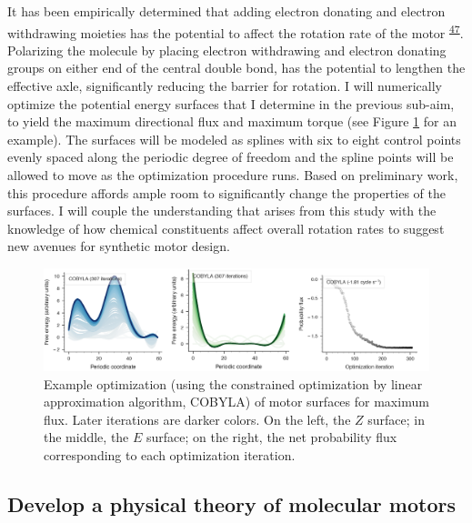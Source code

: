 \documentclass[11pt,notitlepage]{article}
\providecommand{\DIFaddbegin}{} %
\providecommand{\DIFaddend}{} %
\providecommand{\DIFdelbegin}{} %
\providecommand{\DIFdelend}{} %
\newcommand{\DIFscaledelfig}{0.5}
\newlength{\DIFdelgraphicswidth} %
\newlength{\DIFdelgraphicsheight} %
\newcommand{\DIFaddincludegraphics}[2][]{{\color{blue}\fbox{\DIFOincludegraphics[#1]{#2}}}} %
\newcommand{\DIFdelincludegraphics}[2][]{%
\sbox{\DIFdelgraphicsbox}{\DIFOincludegraphics[#1]{#2}}%
\settoboxwidth{\DIFdelgraphicswidth}{\DIFdelgraphicsbox} %
\settoboxtotalheight{\DIFdelgraphicsheight}{\DIFdelgraphicsbox} %
\scalebox{\DIFscaledelfig}{%
\parbox[b]{\DIFdelgraphicswidth}{\usebox{\DIFdelgraphicsbox}\\[-\baselineskip] \rule{\DIFdelgraphicswidth}{0em}}\llap{\resizebox{\DIFdelgraphicswidth}{\DIFdelgraphicsheight}{%
\setlength{\unitlength}{\DIFdelgraphicswidth}%
\begin{picture}(1,1)%
\thicklines\linethickness{2pt} %
{\color[rgb]{1,0,0}\put(0,0){\framebox(1,1){}}}%
{\color[rgb]{1,0,0}\put(0,0){\line( 1,1){1}}}%
{\color[rgb]{1,0,0}\put(0,1){\line(1,-1){1}}}%
\end{picture}%
}\hspace*{3pt}}} %
} %
\DeclareRobustCommand{\DIFaddbegin}{\DIFOaddbegin \let\includegraphics\DIFaddincludegraphics} %
\DeclareRobustCommand{\DIFaddend}{\DIFOaddend \let\includegraphics\DIFOincludegraphics} %
\DeclareRobustCommand{\DIFdelbegin}{\DIFOdelbegin \let\includegraphics\DIFdelincludegraphics} %
\DeclareRobustCommand{\DIFdelend}{\DIFOaddend \let\includegraphics\DIFOincludegraphics} %
\begin{document}
It has been empirically determined that adding electron donating and
electron withdrawing moieties has the potential to affect the rotation
rate of the
motor\textsuperscript{\protect\DIFdelbegin %
\DIFdelend \DIFaddbegin \hyperlink{ref-1AzLiBVkC}{47}\DIFaddend }. Polarizing
the molecule by placing electron withdrawing and electron donating
groups on either end of the central double bond, has the potential to
lengthen the effective axle, significantly reducing the barrier for
rotation. I will numerically optimize the potential energy surfaces that
I determine in the previous sub-aim, to yield the maximum directional
flux and maximum torque (see Figure \ref{fig:COBYLA} for an example).
The surfaces will be modeled as splines with six to eight control points
evenly spaced along the periodic degree of freedom and the spline points
will be allowed to move as the optimization procedure runs. Based on
preliminary work, this procedure affords ample room to significantly
change the properties of the surfaces. I will couple the understanding
that arises from this study with the knowledge of how chemical
constituents affect overall rotation rates to suggest new avenues for
synthetic motor design.

\begin{figure}
\centering
\includegraphics[width=1\textwidth,height=\textheight]{content/images/COBYLA.png}
\caption{Example optimization (using the constrained optimization by
linear approximation algorithm, COBYLA) of motor surfaces for maximum
flux. Later iterations are darker colors. On the left, the \(Z\)
surface; in the middle, the \(E\) surface; on the right, the net
probability flux corresponding to each optimization
iteration.\label{fig:COBYLA}}
\end{figure}

\DIFaddbegin \hypertarget{develop-a-physical-theory-of-molecular-motors}{%
\subsection{Develop a physical theory of molecular
motors}\label{develop-a-physical-theory-of-molecular-motors}}
\end{document}
